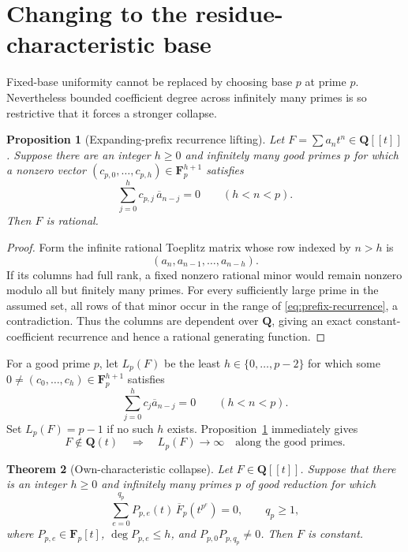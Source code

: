 \documentclass[11pt,reqno]{amsart}
\newtheorem{theorem}{Theorem}[section]
\newtheorem{proposition}[theorem]{Proposition}
\theoremstyle{definition}
\theoremstyle{remark}
\newcommand{\F}{\mathbf F}
\newcommand{\Q}{\mathbf Q}
\begin{document}
\section{Changing to the residue-characteristic base}

Fixed-base uniformity cannot be replaced by choosing base $p$ at prime $p$.
Nevertheless bounded coefficient degree across infinitely many primes is so
restrictive that it forces a stronger collapse.

\begin{proposition}[Expanding-prefix recurrence lifting]
\label{prop:prefix-lifting}
Let $F=\sum a_nt^n\in\Q[[t]]$.  Suppose there are an integer $h\geq0$ and
infinitely many good primes $p$ for which a nonzero vector
$(c_{p,0},\ldots,c_{p,h})\in\F_p^{h+1}$ satisfies
\begin{equation}\label{eq:prefix-recurrence}
 \sum_{j=0}^{h}c_{p,j}\,\overline a_{n-j}=0
 \qquad(h<n<p).
\end{equation}
Then $F$ is rational.
\end{proposition}

\begin{proof}
Form the infinite rational Toeplitz matrix whose row indexed by $n>h$ is
\[
 (a_n,a_{n-1},\ldots,a_{n-h}).
\]
If its columns had full rank, a
fixed nonzero rational minor would remain nonzero modulo all but finitely
many primes.  For every sufficiently large prime in the assumed set, all
rows of that minor occur in the range of \eqref{eq:prefix-recurrence}, a
contradiction.  Thus the columns are dependent over $\Q$, giving an exact
constant-coefficient recurrence and hence a rational generating function.
\end{proof}

For a good prime $p$, let $L_p(F)$ be the least
$h\in\{0,\ldots,p-2\}$ for which some
$0\ne(c_0,\ldots,c_h)\in\F_p^{h+1}$ satisfies
\[
 \sum_{j=0}^{h}c_j\overline a_{n-j}=0\qquad(h<n<p).
\]
Set $L_p(F)=p-1$ if no such $h$ exists.
Proposition~\ref{prop:prefix-lifting} immediately gives
\begin{equation}\label{eq:prefix-escape}
 F\notin\Q(t)\quad\Longrightarrow\quad L_p(F)\longrightarrow\infty
 \quad\text{along the good primes}.
\end{equation}

\begin{theorem}[Own-characteristic collapse]\label{thm:ownp}
Let $F\in\Q[[t]]$.  Suppose that there is an integer $h\geq0$ and infinitely
many primes $p$ of good reduction for which
\begin{equation}\label{eq:ownp}
 \sum_{e=0}^{q_p}P_{p,e}(t)\,\overline F_p(t^{p^e})=0,
 \qquad q_p\geq1,
\end{equation}
where $P_{p,e}\in\F_p[t]$, $\deg P_{p,e}\leq h$, and
$P_{p,0}P_{p,q_p}\neq0$.  Then $F$ is constant.
\end{theorem}
\end{document}
